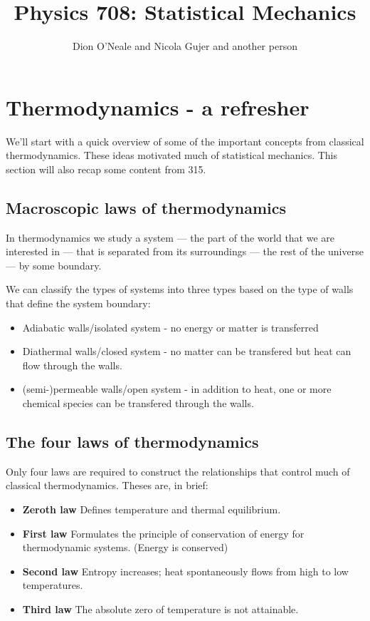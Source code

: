 \documentclass{article}
\title{Physics 708: Statistical Mechanics}
\author{Dion O'Neale 
	and Nicola Gujer
	and another person}
\begin{document}
\maketitle
\section*{Thermodynamics - a refresher}
We'll start with a quick overview of some of the important concepts from classical thermodynamics. These ideas motivated much of statistical mechanics. This section will also recap some content from 315.

\subsection*{Macroscopic laws of thermodynamics}
In thermodynamics we study a system --- the part of the world that we are interested in --- that is separated from its surroundings --- the rest of the universe --- by some boundary.

We can classify the types of systems into three types based on the type of walls that define the system boundary:
\begin{itemize}
\item Adiabatic walls/isolated system - no energy or matter is transferred
\item Diathermal walls/closed system - no matter can be transfered but heat can flow through the walls.
\item (semi-)permeable walls/open system - in addition to heat, one or more chemical species can be transfered through the walls. 
\end{itemize}

\subsection*{The four laws of thermodynamics}
Only four laws are required to construct the relationships that control much of classical thermodynamics. Theses are, in brief:
\begin{itemize}
\item {\bf Zeroth law} Defines temperature and thermal equilibrium.
\item {\bf First law} Formulates the principle of conservation of energy for thermodynamic systems. (Energy is conserved)
\item {\bf Second law} Entropy increases; heat spontaneously flows from high to low temperatures.
\item {\bf Third law} The absolute zero of temperature is not attainable.  
\end{itemize}
\end{document}
